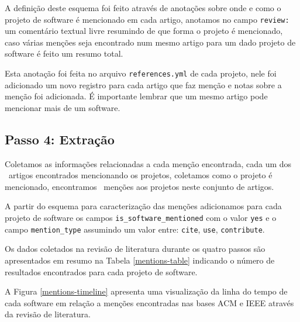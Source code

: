 A definição deste esquema foi feito através de anotações sobre onde
e como o projeto de software é mencionado em cada artigo, anotamos no campo
\texttt{review:} um comentário textual livre resumindo de que forma o projeto
é mencionado, caso várias menções seja encontrado num mesmo artigo para um dado
projeto de software é feito um resumo total.

Esta anotação foi feita no arquivo \texttt{references.yml} de cada projeto, nele
foi adicionado um novo registro para cada artigo que faz menção e notas sobre a
menção foi adicionada. É importante lembrar que um mesmo artigo pode mencionar
mais de um software.


\subsection{Passo 4: Extração}

Coletamos as informações relacionadas a cada menção encontrada, cada um dos
\ScreeningUniqueCount \ artigos encontrados mencionando os projetos, coletamos
como o projeto é mencionado, encontramos \ScreeningCount \ menções aos
projetos neste conjunto de artigos.

A partir do esquema para caracterização das menções adicionamos para
cada projeto de software os campos \texttt{is\_software\_mentioned}
com o valor \texttt{yes} e o campo \texttt{mention\_type} assumindo
um valor entre: \texttt{cite}, \texttt{use}, \texttt{contribute}.

Os dados coletados na revisão de literatura durante os quatro passos são
apresentados em resumo na Tabela \ref{mentions-table} indicando o
número de resultados encontrados para cada projeto de software.



A Figura \ref{mentions-timeline} apresenta uma visualização da linha do tempo
de cada software em relação a menções encontradas nas bases ACM e IEEE através
da revisão de literatura.

